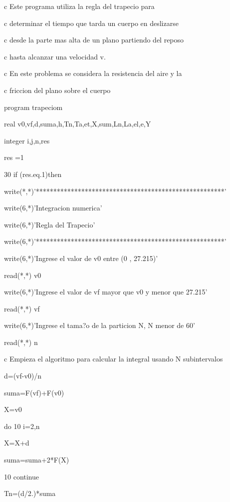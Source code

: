 \setlength{\defaultparindent}{\parindent}
 
%

c     Este programa utiliza la regla del trapecio para

c     determinar el tiempo que tarda un cuerpo en deslizarse

c     desde la parte mas alta de un plano partiendo del reposo

c     hasta alcanzar una velocidad v.

c     En este problema se considera la resistencia del aire y 
la

c     friccion del plano sobre el cuerpo

      program trapeciom

      real v0,vf,d,suma,h,Tn,Ta,et,X,sum,Ln,La,el,e,Y

      integer i,j,n,res

        res =1

30     if (res.eq.1)then

      write(*,*)'******************************************************'

      write(6,*)'Integracion numerica'

      write(6,*)'Regla del Trapecio'

      write(6,*)'******************************************************'

      write(6,*)'Ingrese el valor de v0 entre (0 , 27.215)'

      read(*,*) v0

      write(6,*)'Ingrese el valor de vf mayor que v0 y menor 
que 27.215'

      read(*,*) vf

      write(6,*)'Ingrese el tama?o de la particion N,  N menor 
de 60'

      read(*,*) n

c     Empieza el algoritmo para calcular la integral usando N 
subintervalos

      d=(vf-v0)/n

      suma=F(vf)+F(v0)

      X=v0

      do 10 i=2,n

      X=X+d

      suma=suma+2*F(X)

10    continue

      Tn=(d/2.)*suma

